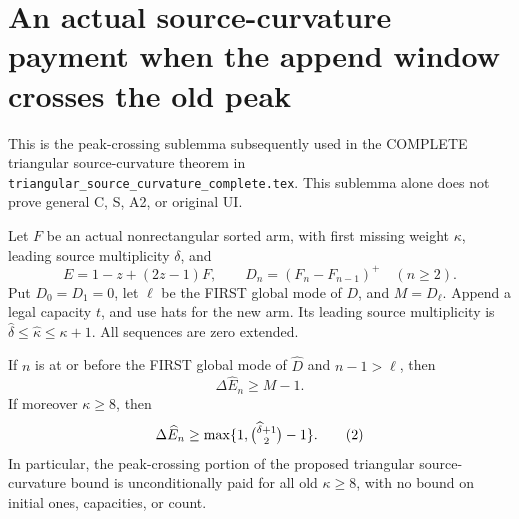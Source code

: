 \section{An actual source-curvature payment when the append window crosses the old peak}
This is the peak-crossing sublemma subsequently used in the COMPLETE
triangular source-curvature theorem in
\texttt{triangular\_source\_curvature\_complete.tex}.
This sublemma alone does not prove general C, S, A2, or original UI.

Let $F$ be an actual nonrectangular sorted arm, with first missing weight
$\kappa$, leading source multiplicity $\delta$, and
\[
 E=1-z+(2z-1)F,\qquad D_n=(F_n-F_{n-1})^+\quad(n\ge2).
\]
Put $D_0=D_1=0$, let $\ell$ be the FIRST global mode of $D$, and
$M=D_\ell$. Append a legal capacity $t$, and use hats for the new arm.
Its leading source multiplicity is $\widehat\delta\le\widehat\kappa
\le\kappa+1$. All sequences are zero extended.

\begin{theorem}
If $n$ is at or before the FIRST global mode of $\widehat D$ and
$n-1>\ell$, then
\[
                    \Delta\widehat E_n\ge M-1.                 \tag{1}
\]
If moreover $\kappa\ge8$, then
\[
 \Delta\widehat E_n\ge
       \max\{1,\tbinom{\widehat\delta+1}{2}-1\}.                \tag{2}
\]
In particular, the peak-crossing portion of the proposed triangular
source-curvature bound is unconditionally paid for all old
$\kappa\ge8$, with no bound on initial ones, capacities, or count.
\end{theorem}

